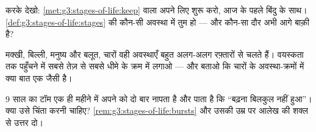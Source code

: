 \begin{exercise}[$\star$]\label{exo:g3:stages-of-life:8}
करके देखो: \cref{met:g3:stages-of-life:keep} वाला  अपने लिए
शुरू करो, आज के पहले बिंदु के साथ।
\cref{def:g3:stages-of-life:stages} की कौन-सी अवस्था में तुम हो --- और
कौन-सा दौर अभी आगे बाक़ी है?
\end{exercise}

\begin{exercise}[$\star\star$]\label{exo:g3:stages-of-life:9}
मक्खी, बिल्ली, मनुष्य और बलूत, चारों वही अवस्थाएँ बहुत अलग-अलग
रफ़्तारों से चलते हैं। वयस्कता तक पहुँचने में सबसे तेज़ से सबसे धीमे
के क्रम में लगाओ --- और बताओ कि चारों के अवस्था-क्रमों में क्या बात
एक जैसी है।
\end{exercise}

\begin{exercise}[$\star\star$]\label{exo:g3:stages-of-life:10}
$9$ साल का टॉम एक ही महीने में अपने को दो बार नापता है और पाता है कि
``बढ़ना बिलकुल नहीं हुआ''। क्या उसे चिंता करनी चाहिए?
\cref{rem:g3:stages-of-life:bursts} और उसकी उम्र पर आलेख की शक्ल से
उत्तर दो।
\end{exercise}
